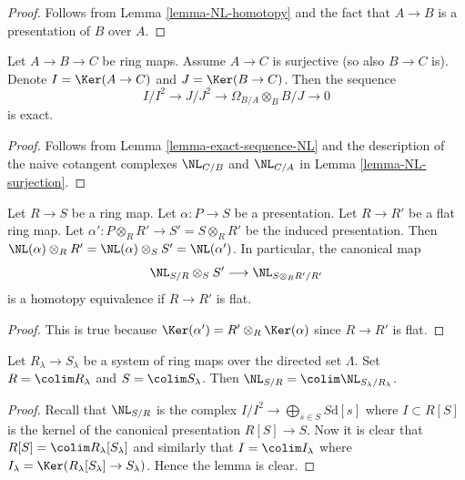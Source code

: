 \begin{proof}
Follows from Lemma \ref{lemma-NL-homotopy}
and the fact that $A \to B$ is a presentation of $B$ over $A$.
\end{proof}

\begin{lemma}
\label{lemma-application-NL}
Let $A \to B \to C$ be ring maps. Assume $A \to C$ is surjective (so
also $B \to C$ is). Denote $I = \Ker(A \to C)$ and
$J = \Ker(B \to C)$. Then the sequence
$$
I/I^2 \to J/J^2 \to \Omega_{B/A} \otimes_B B/J \to 0
$$
is exact.
\end{lemma}

\begin{proof}
Follows from
Lemma \ref{lemma-exact-sequence-NL}
and the description of the naive cotangent complexes
$\NL_{C/B}$ and $\NL_{C/A}$ in Lemma \ref{lemma-NL-surjection}.
\end{proof}

\begin{lemma}
\label{lemma-change-base-NL}
Let $R \to S$ be a ring map. Let $\alpha : P \to S$ be a presentation.
Let $R \to R'$ be a flat ring map.
Let $\alpha' : P \otimes_R R' \to S' = S \otimes_R R'$
be the induced presentation.
Then $\NL(\alpha) \otimes_R R' = \NL(\alpha) \otimes_S S' = \NL(\alpha')$.
In particular, the canonical map
$$
\NL_{S/R} \otimes_S S' \longrightarrow \NL_{S \otimes_R R'/R'}
$$
is a homotopy equivalence if $R \to R'$ is flat.
\end{lemma}

\begin{proof}
This is true because
$\Ker(\alpha') = R' \otimes_R \Ker(\alpha)$
since $R \to R'$ is flat.
\end{proof}

\begin{lemma}
\label{lemma-colimits-NL}
Let $R_\lambda \to S_\lambda$ be a system of ring maps over
the directed set $\Lambda$.
Set $R = \colim R_\lambda$ and $S = \colim S_\lambda$.
Then $\NL_{S/R} = \colim \NL_{S_\lambda/R_\lambda}$.
\end{lemma}

\begin{proof}
Recall that $\NL_{S/R}$ is the complex
$I/I^2 \to \bigoplus_{s \in S} S\text{d}[s]$ where $I \subset R[S]$
is the kernel of the canonical presentation $R[S] \to S$.
Now it is clear that $R[S] = \colim R_\lambda[S_\lambda]$ and similarly
that $I = \colim I_\lambda$ where
$I_\lambda = \Ker(R_\lambda[S_\lambda] \to S_\lambda)$.
Hence the lemma is clear.
\end{proof}

